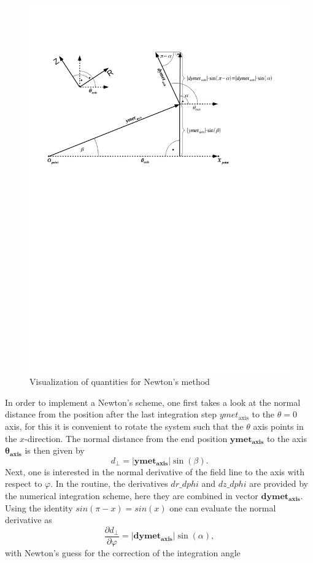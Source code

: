 \documentclass[./main.tex]{subfiles}
\begin{document}
\begin{figure}[h!]
	\includegraphics[trim={5 15cm 0 5},clip, width = 1.0\textwidth]{figures/fli_angle_graphics.pdf}
	\caption{Visualization of quantities for Newton's method}
	\label{fig:field_line_integration_geometric}
\end{figure}

In order to implement a Newton's scheme, one first takes a look at the normal distance from the position after the last integration step $ymet_\text{axis}$ to the $\theta=0$ axis, for this it is convenient to rotate the system such that the $\theta$ axis points in the $x$-direction. The normal distance from the end position $\bm{ymet_\text{axis}}$ to the axis $\bm{\theta_\text{axis}}$ is then given by 
\begin{equation*}
	d_\perp =|\bm{ymet_\text{axis}}|\sin(\beta).
\end{equation*}
Next, one is interested in the normal derivative of the field line to the axis with respect to $\varphi$. In the routine, the derivatives $dr\_dphi$ and $dz\_dphi$ are provided by the numerical integration scheme, here they are combined in vector $\bm{dymet_\text{axis}}$. Using the identity $sin(\pi-x)=sin(x)$ one can evaluate the normal derivative as 
\begin{equation*}
\frac{\partial d_\perp}{\partial \varphi} =|\bm{dymet_\text{axis}}|\sin(\alpha),
\end{equation*}
with Newton's guess for the correction of the integration angle
\end{document}
